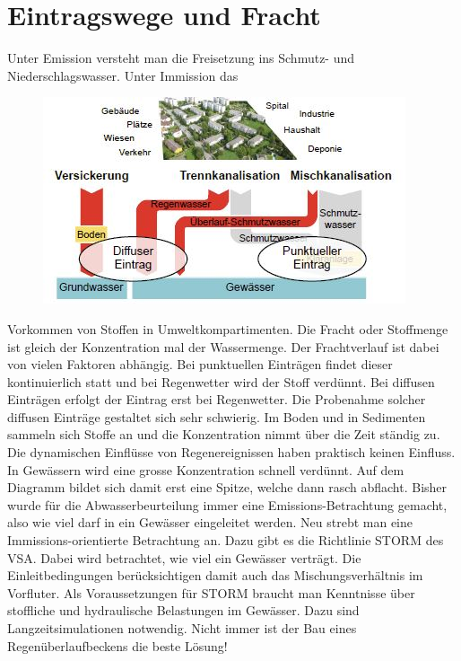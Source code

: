 \documentclass[9pt, openright=false]{scrartcl}
\begin{document}
\section{Eintragswege und Fracht}
Unter Emission versteht man die Freisetzung ins Schmutz- und Niederschlagswasser. Unter Immission das\begin{figure} 
  \includegraphics[width=.5\textwidth]{images/Eintrag}
\end{figure} Vorkommen von Stoffen in Umweltkompartimenten. Die Fracht oder Stoffmenge ist gleich der Konzentration mal der Wassermenge. Der Frachtverlauf ist dabei von vielen Faktoren abhängig. Bei punktuellen Einträgen findet dieser kontinuierlich statt und bei Regenwetter wird der Stoff verdünnt. Bei diffusen Einträgen erfolgt der Eintrag erst bei Regenwetter. Die Probenahme solcher diffusen Einträge gestaltet sich sehr schwierig. Im Boden und in Sedimenten sammeln sich Stoffe an und die Konzentration nimmt über die Zeit ständig zu. Die dynamischen Einflüsse von Regenereignissen haben praktisch keinen Einfluss. In Gewässern wird eine grosse Konzentration schnell verdünnt. Auf dem Diagramm bildet sich damit erst eine Spitze, welche dann rasch abflacht. Bisher wurde für die Abwasserbeurteilung immer eine Emissions-Betrachtung gemacht, also wie viel darf in ein Gewässer eingeleitet werden. Neu strebt man eine Immissions-orientierte Betrachtung an. Dazu gibt es die Richtlinie STORM des VSA. Dabei wird betrachtet, wie viel ein Gewässer verträgt. Die Einleitbedingungen berücksichtigen damit auch das Mischungsverhältnis im Vorfluter. Als Voraussetzungen für STORM braucht man Kenntnisse über stoffliche und hydraulische Belastungen im Gewässer. Dazu sind Langzeitsimulationen notwendig. Nicht immer ist der Bau eines Regenüberlaufbeckens die beste Lösung!
\end{document}
